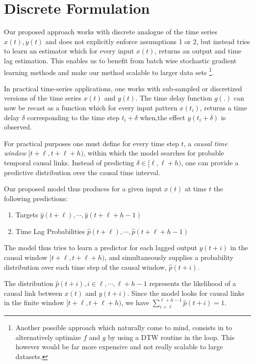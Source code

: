 \documentclass[envcountsect,runningheads]{llncs}
\theoremstyle{etoile}
\begin{document}
\section{Discrete Formulation}

Our proposed approach works with discrete analogue of the time series $x(t), y(t)$ 
and does not explicitly enforce assumptions 1 or 2, but instead tries to learn an 
estimator which for every input $x(t)$, returns an output and time lag estimation. 
This enables us to benefit from batch wise stochastic gradient learning methods and 
make our method scalable to larger data sets \footnote{Another possible approach which 
naturally come to mind, consists in to alternatively optimize $f$ and $g$ by using a 
DTW routine in the loop. This however would be far more expensive and not 
really scalable to large datasets.}.

In practical time-series applications, one works with sub-sampled or discretized versions of the time 
series $x(t)$ and $y(t)$. The time delay function $g(.)$ can now be recast as a function which for 
every input pattern $x(t_i)$, returns a time delay $\delta$ corresponding to the time step 
$t_i + \delta$ when,the effect $y(t_i + \delta)$ is observed.

For practical purposes one must define for every time step $t$, a \emph{causal time window} 
$[t+\ell, t+\ell+h)$, within which the model searches for probable temporal causal links. 
Instead of predicting $\delta \in [\ell, \ell+h)$, one can provide a predictive distribution 
over the causal time interval.

Our proposed model thus produces for a given input $x(t)$ at time $t$ the following predictions:

\begin{enumerate}
\item Targets $\hat{y}(t+\ell), \cdots, \hat{y}(t+\ell+h-1)$
\item Time Lag Probabilities $\hat{p}(t+\ell), \cdots, \hat{p}(t+\ell+h-1)$
\end{enumerate}

The model thus tries to learn a predictor for each lagged output $y(t+i)$ in the causal window 
$[t+\ell, t+\ell+h)$, and simultaneously supplies a probability distribution over each time step 
of the causal window, $\hat{p}(t+i)$.

The distribution $\hat{p}(t+i), i \in {\ell, \cdots, \ell+h-1}$ represents the 
likelihood of a causal link between $x(t)$ and $y(t+i)$. Since the model looks
for causal links in the finite window $[t+\ell, t+\ell+h)$, we have 
$\sum^{\ell+h-1}_{i = \ell}{\hat{p}(t + i)} = 1$.
\end{document}
